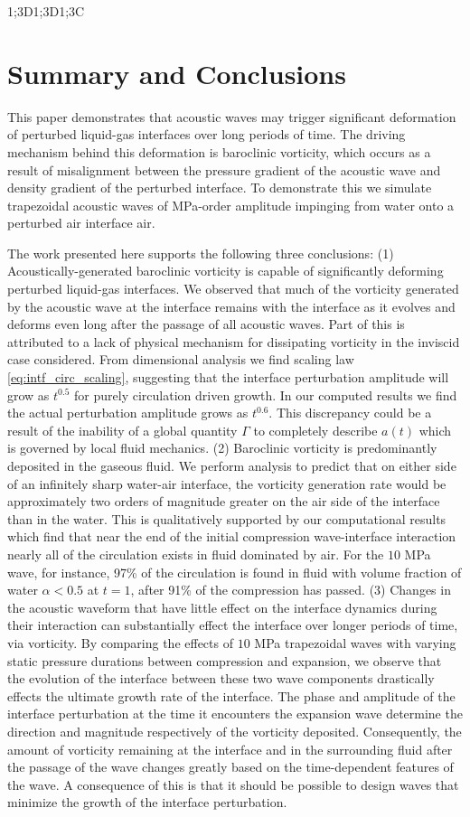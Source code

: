 1;3D1;3D1;3C\section{Summary and Conclusions}
\label{sec:conclusions}
This paper demonstrates that acoustic waves may trigger significant
deformation of perturbed liquid-gas interfaces over long periods of
time. The driving mechanism behind this deformation is baroclinic
vorticity, which occurs as a result of misalignment between the
pressure gradient of the acoustic wave and density gradient of the
perturbed interface. To demonstrate this we simulate trapezoidal
acoustic waves of MPa-order amplitude impinging from water onto a
perturbed air interface air.

The work presented here supports the following three conclusions: (1)
Acoustically-generated baroclinic vorticity is capable of
significantly deforming perturbed liquid-gas interfaces. We observed
that much of the vorticity generated by the acoustic wave at the
interface remains with the interface as it evolves and deforms even
long after the passage of all acoustic waves. Part of this is
attributed to a lack of physical mechanism for dissipating vorticity
in the inviscid case considered. From dimensional analysis we find
scaling law \eqref{eq:intf_circ_scaling}, suggesting that the
interface perturbation amplitude will grow as $t^{0.5}$ for purely
circulation driven growth. In our computed results we find the actual
perturbation amplitude grows as $t^{0.6}$. This discrepancy could be a
result of the inability of a global quantity $\Gamma$ to completely
describe $a(t)$ which is governed by local fluid mechanics.
%
(2) Baroclinic vorticity is predominantly deposited in the gaseous
fluid. We perform analysis to predict that on either side of an
infinitely sharp water-air interface, the vorticity generation rate
would be approximately two orders of magnitude greater on the air side
of the interface than in the water. This is qualitatively supported by
our computational results which find that near the end of the initial
compression wave-interface interaction nearly all of the circulation
exists in fluid dominated by air. For the $10$ MPa wave, for instance,
97\% of the circulation is found in fluid with volume fraction of
water $\alpha<0.5$ at $t=1$, after 91\% of the compression has passed.
%
(3) Changes in the acoustic waveform that have little effect on the
interface dynamics during their interaction can substantially effect
the interface over longer periods of time, via vorticity. By comparing
the effects of $10$ MPa trapezoidal waves with varying static pressure
durations between compression and expansion, we observe that the
evolution of the interface between these two wave components
drastically effects the ultimate growth rate of the interface. The
phase and amplitude of the interface perturbation at the time it
encounters the expansion wave determine the direction and magnitude
respectively of the vorticity deposited. Consequently, the amount of
vorticity remaining at the interface and in the surrounding fluid
after the passage of the wave changes greatly based on the
time-dependent features of the wave. A consequence of this is that it
should be possible to design waves that minimize the growth of the
interface perturbation.

